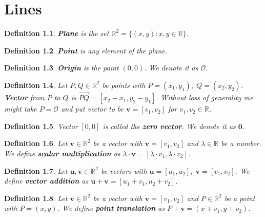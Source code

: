 \documentclass[a4paper,12pt]{report}
\newtheorem{definition}{Definition}
\begin{document}
\chapter{Lines}

\begin{definition}
  \textbf{Plane} is the set $\mathbb{R}^2=\{(x,y):x,y\in\mathbb{R}\}$.
\end{definition}

\begin{definition}
  \textbf{Point} is any element of the plane.
\end{definition}

\begin{definition}
  \textbf{Origin} is the point $(0,0)$. We denote it as $\mathcal{O}$.
\end{definition}

\begin{definition}
  Let $P,Q\in\mathbb{R}^2$ be points with $P=(x_1,y_1),\; Q=(x_2,y_2)$. \textbf{Vector} from $P$ to $Q$ is $\vec{PQ}=[x_2-x_1,y_2-y_1]$. Without loss of generality me might take $P=\mathcal{O}$ and put vector to be $\mathbf{v}=[v_1,v_2]$ for $v_1,v_2\in\mathbb{R}$.
\end{definition}

\begin{definition}
  Vector $[0,0]$ is called the \textbf{zero vector}. We denote it as $\mathbf{0}$.
\end{definition}

\begin{definition}
  Let $\mathbf{v}\in\mathbb{R}^2$ be a vector with $\mathbf{v}=[v_1,v_2]$ and $\lambda \in\mathbb{R}$ be a number. We define \textbf{scalar multiplication} as $\lambda\cdot\mathbf{v}=[\lambda\cdot v_1,\lambda\cdot v_2]$.
\end{definition}

\begin{definition}
  Let $\mathbf{u},\mathbf{v}\in\mathbb{R}^2$ be vectors with $\mathbf{u}=[u_1,u_2],\;\mathbf{v}=[v_1,v_2]$. We define \textbf{vector addition} as $\mathbf{u}+\mathbf{v}=[u_1+v_1,u_2+v_2]$.
\end{definition}

\begin{definition}
  Let $\mathbf{v}\in\mathbb{R}^2$ be a vector with $\mathbf{v}=[v_1,v_2]$ and $P\in\mathbb{R}^2$ be a point with $P=(x,y)$. We define \textbf{point translation} as $P+\mathbf{v}=(x+v_1,y+v_2)$.
\end{definition}
\end{document}

